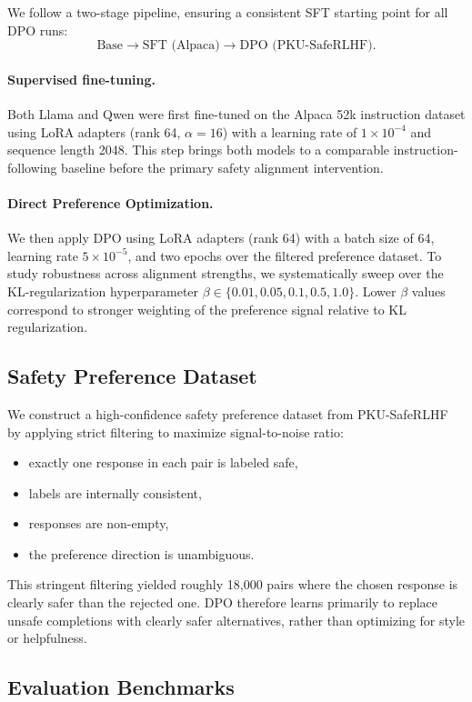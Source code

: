 \documentclass[a4paper, twocolumn, 9pt]{article}
\begin{document}
We follow a two-stage pipeline, ensuring a consistent SFT starting point for all DPO runs:
\[
\text{Base} \rightarrow \text{SFT (Alpaca)} \rightarrow \text{DPO (PKU-SafeRLHF)}.
\]

\paragraph{Supervised fine-tuning.}
Both Llama and Qwen were first fine-tuned on the Alpaca 52k instruction dataset using LoRA adapters (rank 64, $\alpha=16$) with a learning rate of $1\times 10^{-4}$ and sequence length 2048. This step brings both models to a comparable instruction-following baseline before the primary safety alignment intervention.

\paragraph{Direct Preference Optimization.}
We then apply DPO using LoRA adapters (rank 64) with a batch size of 64, learning rate $5\times 10^{-5}$, and two epochs over the filtered preference dataset.
To study robustness across alignment strengths, we systematically sweep over the KL-regularization hyperparameter $\beta \in \{0.01, 0.05, 0.1, 0.5, 1.0\}$.
Lower $\beta$ values correspond to stronger weighting of the preference signal relative to KL regularization.

\subsection{Safety Preference Dataset}

We construct a high-confidence safety preference dataset from PKU-SafeRLHF~\cite{pku-saferlhf} by applying strict filtering to maximize signal-to-noise ratio:
\begin{itemize}
\item exactly one response in each pair is labeled safe,
\item labels are internally consistent,
\item responses are non-empty,
\item the preference direction is unambiguous.
\end{itemize}
This stringent filtering yielded roughly 18,000 pairs where the chosen response is clearly safer than the rejected one. DPO therefore learns primarily to replace unsafe completions with clearly safer alternatives, rather than optimizing for style or helpfulness.

\subsection{Evaluation Benchmarks}
\end{document}
